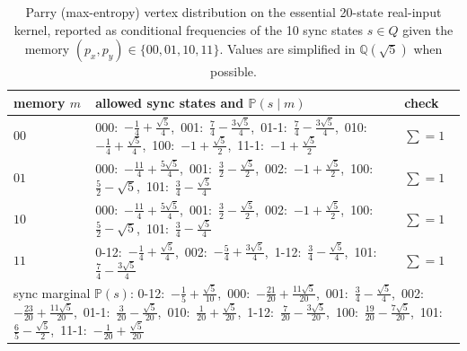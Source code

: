 \begin{table}[H]
\centering
\scriptsize
\setlength{\tabcolsep}{6pt}
\caption{Parry (max-entropy) vertex distribution on the essential 20-state real-input kernel, reported as conditional frequencies of the 10 sync states $s\in Q$ given the memory $(p_x,p_y)\in\{00,01,10,11\}$. Values are simplified in $\mathbb Q(\sqrt5)$ when possible.}
\label{tab:real_input_40_parry_internal_distribution}
\begin{tabular}{l l l}
\toprule
memory $m$ & allowed sync states and $\mathbb P(s\mid m)$ & check\\
\midrule
$00$ & 000:\ $- \frac{1}{4} + \frac{\sqrt{5}}{4}$,\ 001:\ $\frac{7}{4} - \frac{3 \sqrt{5}}{4}$,\ 01-1:\ $\frac{7}{4} - \frac{3 \sqrt{5}}{4}$,\ 010:\ $- \frac{1}{4} + \frac{\sqrt{5}}{4}$,\ 100:\ $-1 + \frac{\sqrt{5}}{2}$,\ 11-1:\ $-1 + \frac{\sqrt{5}}{2}$ & $\sum=1$\\
$01$ & 000:\ $- \frac{11}{4} + \frac{5 \sqrt{5}}{4}$,\ 001:\ $\frac{3}{2} - \frac{\sqrt{5}}{2}$,\ 002:\ $-1 + \frac{\sqrt{5}}{2}$,\ 100:\ $\frac{5}{2} - \sqrt{5}$,\ 101:\ $\frac{3}{4} - \frac{\sqrt{5}}{4}$ & $\sum=1$\\
$10$ & 000:\ $- \frac{11}{4} + \frac{5 \sqrt{5}}{4}$,\ 001:\ $\frac{3}{2} - \frac{\sqrt{5}}{2}$,\ 002:\ $-1 + \frac{\sqrt{5}}{2}$,\ 100:\ $\frac{5}{2} - \sqrt{5}$,\ 101:\ $\frac{3}{4} - \frac{\sqrt{5}}{4}$ & $\sum=1$\\
$11$ & 0-12:\ $- \frac{1}{4} + \frac{\sqrt{5}}{4}$,\ 002:\ $- \frac{5}{4} + \frac{3 \sqrt{5}}{4}$,\ 1-12:\ $\frac{3}{4} - \frac{\sqrt{5}}{4}$,\ 101:\ $\frac{7}{4} - \frac{3 \sqrt{5}}{4}$ & $\sum=1$\\
\midrule
\multicolumn{3}{l}{sync marginal $\mathbb P(s)$: 0-12:\ $- \frac{1}{5} + \frac{\sqrt{5}}{10}$,\ 000:\ $- \frac{21}{20} + \frac{11 \sqrt{5}}{20}$,\ 001:\ $\frac{3}{4} - \frac{\sqrt{5}}{4}$,\ 002:\ $- \frac{23}{20} + \frac{11 \sqrt{5}}{20}$,\ 01-1:\ $\frac{3}{20} - \frac{\sqrt{5}}{20}$,\ 010:\ $\frac{1}{20} + \frac{\sqrt{5}}{20}$,\ 1-12:\ $\frac{7}{20} - \frac{3 \sqrt{5}}{20}$,\ 100:\ $\frac{19}{20} - \frac{7 \sqrt{5}}{20}$,\ 101:\ $\frac{6}{5} - \frac{\sqrt{5}}{2}$,\ 11-1:\ $- \frac{1}{20} + \frac{\sqrt{5}}{20}$}\\
\bottomrule
\end{tabular}
\end{table}
